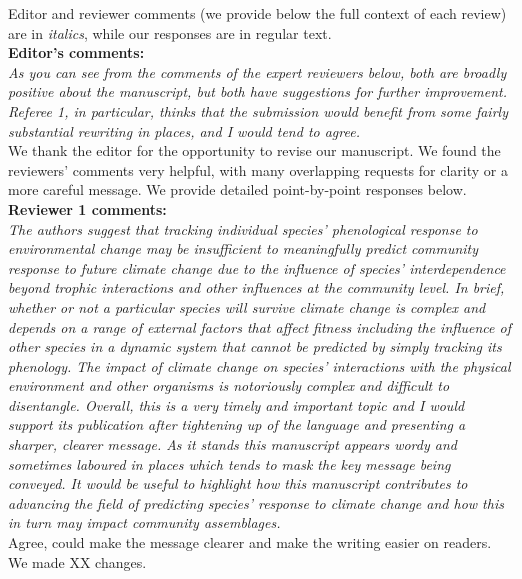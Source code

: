 \documentclass[11pt]{article}
\begin{document}
Editor and reviewer comments (we provide below the full context of each review) are in \emph{italics}, while our responses are in regular text. \\ 

{\bf Editor's comments:} \\

\emph{As you can see from the comments of the expert reviewers below, both are broadly positive
about the manuscript, but both have suggestions for further improvement. Referee 1, in
particular, thinks that the submission would benefit from some fairly substantial rewriting
in places, and I would tend to agree.}\\

We thank the editor for the opportunity to revise our manuscript. We found the reviewers' comments very helpful, with many overlapping requests for clarity or a more careful message. We provide detailed point-by-point responses below.\\

{\bf Reviewer 1 comments:} \\


\emph{The authors suggest that tracking individual species' phenological response to environmental
change may be insufficient to meaningfully predict community response to future climate
change due to the influence of species' interdependence beyond trophic interactions and other
influences at the community level. In brief, whether or not a particular species will survive
climate change is complex and depends on a range of external factors that affect fitness
including the influence of other species in a dynamic system that cannot be predicted by
simply tracking its phenology. The impact of climate change on species' interactions with the
physical environment and other organisms is notoriously complex and difficult to disentangle.
Overall, this is a very timely and important topic and I would support its publication after
tightening up of the language and presenting a sharper, clearer message. As it stands this
manuscript appears wordy and sometimes laboured in places which tends to mask the key message
being conveyed. It would be useful to highlight how this manuscript contributes to advancing
the field of predicting species' response to climate change and how this in turn may impact
community assemblages.}\\

Agree, could make the message clearer and make the writing easier on readers. We made XX changes.\\
\end{document}
